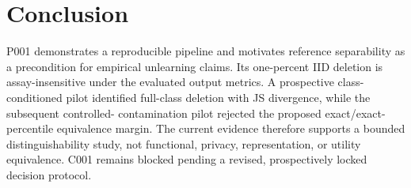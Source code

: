 \section{Conclusion}
P001 demonstrates a reproducible pipeline and motivates reference separability as a
precondition for empirical unlearning claims. Its one-percent IID deletion is
assay-insensitive under the evaluated output metrics. A prospective class-conditioned pilot
identified full-class deletion with JS divergence, while the subsequent controlled-
contamination pilot rejected the proposed exact/exact-percentile equivalence margin. The
current evidence therefore supports a bounded distinguishability study, not functional,
privacy, representation, or utility equivalence. C001 remains blocked pending a revised,
prospectively locked decision protocol.
